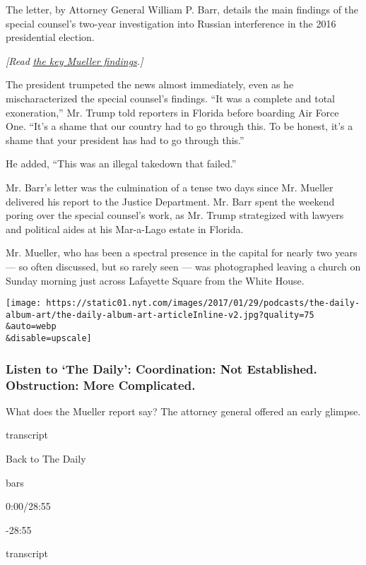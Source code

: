The letter, by Attorney General William P. Barr, details the main
findings of the special counsel's two-year investigation into Russian
interference in the 2016 presidential election.

\emph{{[}Read}
\href{https://www.nytimes.com/interactive/2019/03/24/us/politics/barr-letter-mueller-report.html}{\emph{the
key Mueller findings}}\emph{.{]}}

The president trumpeted the news almost immediately, even as he
mischaracterized the special counsel's findings. ``It was a complete and
total exoneration,'' Mr. Trump told reporters in Florida before boarding
Air Force One. ``It's a shame that our country had to go through this.
To be honest, it's a shame that your president has had to go through
this.''

He added, ``This was an illegal takedown that failed.''

Mr. Barr's letter was the culmination of a tense two days since Mr.
Mueller delivered his report to the Justice Department. Mr. Barr spent
the weekend poring over the special counsel's work, as Mr. Trump
strategized with lawyers and political aides at his Mar-a-Lago estate in
Florida.

Mr. Mueller, who has been a spectral presence in the capital for nearly
two years --- so often discussed, but so rarely seen --- was
photographed leaving a church on Sunday morning just across Lafayette
Square from the White House.

\texttt{[image: https://static01.nyt.com/images/2017/01/29/podcasts/the-daily-album-art/the-daily-album-art-articleInline-v2.jpg?quality=75\\\&auto=webp\\\&disable=upscale]}

\hypertarget{listen-to-the-daily-coordination-not-established-obstruction-more-complicated}{%
\subsubsection{Listen to `The Daily': Coordination: Not Established.
Obstruction: More
Complicated.}\label{listen-to-the-daily-coordination-not-established-obstruction-more-complicated}}

What does the Mueller report say? The attorney general offered an early
glimpse.

transcript

Back to The Daily

bars

0:00/28:55

-28:55

transcript

